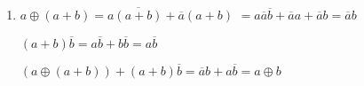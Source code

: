 \documentclass[a4paper,12pt]{article}
\begin{document}
\begin{enumerate}
        \item $a \oplus (a + b) = a\overline{(a + b)} + \overline{a}(a + b)$
        $= a\overline{a}\overline{b} + \overline{a}a + \overline{a}b = \overline{a}b$

        $(a + b)\overline{b} = a\overline{b} + b\overline{b} = a\overline{b}$

        $(a \oplus (a + b)) + (a + b)\overline{b} = \overline{a}b + a\overline{b} = a \oplus b $

    \end{enumerate}
\end{document}
